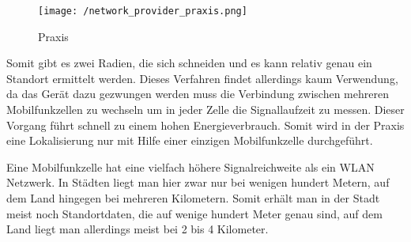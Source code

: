 \begin{wrapfigure}{r}{43mm}
\centering
   \texttt{[image: /network\_provider\_praxis.png]} 
   \vspace{-5mm}
   \caption[Lokalisierung: NETWORK Provider in der Praxis]{Praxis}
   \vspace{-5mm}
\end{wrapfigure}
Somit gibt es zwei Radien, die sich schneiden und es kann relativ genau ein Standort ermittelt werden. 
Dieses Verfahren findet allerdings kaum Verwendung, da das Gerät dazu gezwungen werden muss die Verbindung zwischen  mehreren Mobilfunkzellen zu wechseln um in jeder Zelle die Signallaufzeit zu messen. Dieser Vorgang führt schnell zu einem hohen Energieverbrauch. Somit wird in der Praxis eine Lokalisierung nur mit Hilfe einer einzigen Mobilfunkzelle durchgeführt. 

Eine Mobilfunkzelle hat eine vielfach höhere Signalreichweite als ein WLAN Netzwerk. In Städten liegt man hier zwar nur bei wenigen hundert Metern, auf dem Land hingegen bei mehreren Kilometern. Somit erhält man in der Stadt meist noch Standortdaten, die auf wenige hundert Meter genau sind, auf dem Land liegt man allerdings meist bei 2 bis 4 Kilometer.

